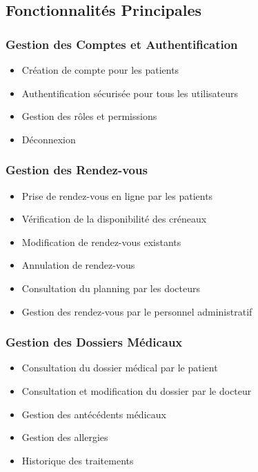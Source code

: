 \documentclass[12pt,a4paper]{report}
\begin{document}
\subsection{Fonctionnalités Principales}

\subsubsection{Gestion des Comptes et Authentification}

\begin{itemize}
    \item Création de compte pour les patients
    \item Authentification sécurisée pour tous les utilisateurs
    \item Gestion des rôles et permissions
    \item Déconnexion
\end{itemize}

\subsubsection{Gestion des Rendez-vous}

\begin{itemize}
    \item Prise de rendez-vous en ligne par les patients
    \item Vérification de la disponibilité des créneaux
    \item Modification de rendez-vous existants
    \item Annulation de rendez-vous
    \item Consultation du planning par les docteurs
    \item Gestion des rendez-vous par le personnel administratif
\end{itemize}

\subsubsection{Gestion des Dossiers Médicaux}

\begin{itemize}
    \item Consultation du dossier médical par le patient
    \item Consultation et modification du dossier par le docteur
    \item Gestion des antécédents médicaux
    \item Gestion des allergies
    \item Historique des traitements
\end{itemize}
\end{document}
